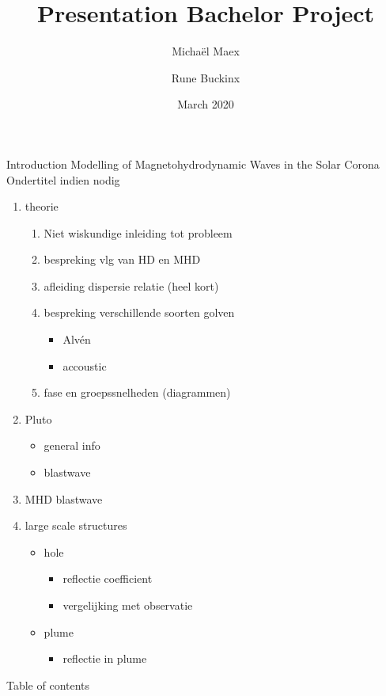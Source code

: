 \documentclass{beamer}
\title{Presentation Bachelor Project}
\author{\phantom{=}Micha\"el Maex \and Rune Buckinx }
\date{March 2020}
\begin{document}
\maketitle
\begin{frame}{Introduction} %
    \huge{Modelling of Magnetohydrodynamic Waves in the Solar Corona}\\
    \Large{Ondertitel indien nodig}
\end{frame}

\begin{frame}
	\begin{enumerate}
		\item theorie
			\begin{enumerate}
				\item Niet wiskundige inleiding tot probleem
				\item bespreking vlg van HD en MHD
				\item afleiding dispersie relatie (heel kort)
				\item bespreking verschillende soorten golven
					\begin{itemize}
						\item Alv\'en
						\item accoustic
					\end{itemize}
				\item fase en groepssnelheden (diagrammen)
			\end{enumerate}
		\item Pluto
			\begin{itemize}
				\item general info
				\item blastwave
			\end{itemize}
		\item MHD blastwave
		\item large scale structures
			\begin{itemize}
				\item hole
					\begin{itemize}
						\item reflectie coefficient
						\item vergelijking met observatie
					\end{itemize}
				\item plume
					\begin{itemize}
						\item reflectie in plume 
					\end{itemize}
			\end{itemize}
	\end{enumerate}
\end{frame}
\begin{frame}{Table of contents}
    \tableofcontents
\end{frame}
\end{document}
